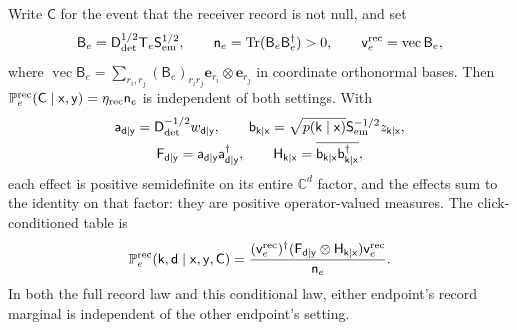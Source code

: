 Write $\mathsf C$ for the event that the receiver record is not null, and set
\begin{equation}
\mathsf B_e=\mathsf D_{\rm det}^{1/2}\mathsf T_e\mathsf S_{\rm em}^{1/2},
\qquad
\mathsf n_e=\operatorname{Tr}(\mathsf B_e\mathsf B_e^{\dagger})>0,
\qquad
\mathsf v_e^{\rm rec}=\operatorname{vec}\mathsf B_e,
\label{eq:obs-intensity-calibrated-link}
\end{equation}
where $\operatorname{vec}\mathsf B_e=\sum_{r_i,r_j}(\mathsf B_e)_{r_i r_j}
\mathbf e_{r_i}\otimes\mathbf e_{r_j}$ in coordinate orthonormal bases. Then
$\mathbb P_e^{\rm rec}(\mathsf C\mid\mathsf x,\mathsf y)
=\eta_{\rm rec}\mathsf n_e$ is independent of both settings. With
\begin{equation}
\begin{gathered}
\mathsf a_{\mathsf d\mid\mathsf y}=\mathsf D_{\rm det}^{-1/2}w_{\mathsf d\mid\mathsf y},
\qquad
\mathsf b_{\mathsf k\mid\mathsf x}=\sqrt{p(\mathsf k\mid\mathsf x)}
\mathsf S_{\rm em}^{-1/2}z_{\mathsf k\mid\mathsf x},\\
\mathsf F_{\mathsf d\mid\mathsf y}=\mathsf a_{\mathsf d\mid\mathsf y}
\mathsf a_{\mathsf d\mid\mathsf y}^{\dagger},
\qquad
\mathsf H_{\mathsf k\mid\mathsf x}=\overline{
\mathsf b_{\mathsf k\mid\mathsf x}\mathsf b_{\mathsf k\mid\mathsf x}^{\dagger}},
\end{gathered}
\label{eq:obs-intensity-effects}
\end{equation}
each effect is positive semidefinite on its entire $\mathbb C^d$ factor,
and the effects sum to the identity on that factor: they are positive
operator-valued measures. The click-conditioned table is
\begin{equation}
\mathbb P_e^{\rm rec}(\mathsf k,\mathsf d\mid\mathsf x,\mathsf y,\mathsf C)
=\frac{(\mathsf v_e^{\rm rec})^{\dagger}
(\mathsf F_{\mathsf d\mid\mathsf y}\otimes\mathsf H_{\mathsf k\mid\mathsf x})
\mathsf v_e^{\rm rec}}{\mathsf n_e}.
\label{eq:obs-intensity-born-table}
\end{equation}
In both the full record law and this conditional law, either endpoint's
record marginal is independent of the other endpoint's setting.

